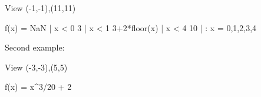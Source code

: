 \documentclass{article}
\begin{document}
\begin{latexgrapher}[width=100]
View (-1,-1),(11,11)

f(x) = NaN          | x < 0
       3            | x < 1
       3+2*floor(x) | x < 4
       10           |
                    : x = 0,1,2,3,4
\end{latexgrapher}

Second example:

\begin{latexgrapher}
View (-3,-3),(5,5)

f(x) = x^3/20 + 2
\end{latexgrapher}
\end{document}
